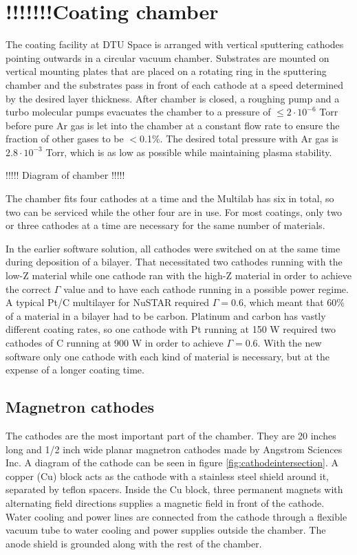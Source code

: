 \section{!!!!!!!Coating chamber}
The coating facility at DTU Space is arranged with vertical sputtering cathodes pointing outwards in a circular vacuum chamber. Substrates are mounted on vertical mounting plates that are placed on a rotating ring in the sputtering chamber and the substrates pass in front of each cathode at a speed determined by the desired layer thickness. After chamber is closed, a roughing pump and a turbo molecular pumps evacuates the chamber to a pressure of $\leq2\cdot10^{-6}$ Torr before pure Ar gas is let into the chamber at a constant flow rate to ensure the fraction of other gases to be $<$0.1\%. The desired total pressure with Ar gas is $2.8\cdot10^{-3}$ Torr, which is as low as possible while maintaining plasma stability.

!!!!! Diagram of chamber !!!!!

The chamber fits four cathodes at a time and the Multilab has six in total, so two can be serviced while the other four are in use. For most coatings, only two or three cathodes at a time are necessary for the same number of materials.

In the earlier software solution, all cathodes were switched on at the same time during deposition of a bilayer. That necessitated two cathodes running with the low-Z material while one cathode ran with the high-Z material in order to achieve the correct $\Gamma$ value and to have each cathode running in a possible power regime. A typical Pt/C  multilayer for NuSTAR required $\Gamma = 0.6$, which meant that 60\% of a material in a bilayer had to be carbon. Platinum and carbon has vastly different coating rates, so one cathode with Pt running at 150 W required two cathodes of C running at 900 W in order to achieve $\Gamma = 0.6$. With the new software only one cathode with each kind of material is necessary, but at the expense of a longer coating time.

\subsection{Magnetron cathodes}
The cathodes are the most important part of the chamber. They are 20 inches long and 1/2 inch wide planar magnetron cathodes made by Angstrom Sciences Inc. A diagram of the cathode can be seen in figure \ref{fig:cathodeintersection}. A copper (Cu) block acts as the cathode with a stainless steel shield around it, separated by teflon spacers. Inside the Cu block, three permanent magnets with alternating field directions supplies a magnetic field in front of the cathode. Water cooling and power lines are connected from the cathode through a flexible vacuum tube to water cooling and power supplies outside the chamber. The anode shield is grounded along with the rest of the chamber.

